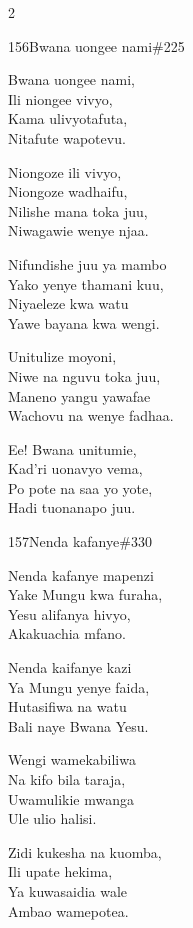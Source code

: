\begin{multicols}{2}
\begin{hymn}{156}{Bwana uongee nami}{\#225}
\begin{stanza}
Bwana uongee nami,\\
Ili niongee vivyo,\\
Kama ulivyotafuta,\\
Nitafute wapotevu.
\end{stanza}
\begin{stanza}
Niongoze ili vivyo,\\
Niongoze wadhaifu,\\
Nilishe mana toka juu,\\
Niwagawie wenye njaa.
\end{stanza}
\begin{stanza}
Nifundishe juu ya mambo\\
Yako yenye thamani kuu,\\
Niyaeleze kwa watu\\
Yawe bayana kwa wengi.
\end{stanza}
\begin{stanza}
Unitulize moyoni,\\
Niwe na nguvu toka juu,\\
Maneno yangu yawafae\\
Wachovu na wenye fadhaa.
\end{stanza}
\begin{stanza}
Ee! Bwana unitumie,\\
Kad'ri uonavyo vema,\\
Po pote na saa yo yote,\\
Hadi tuonanapo juu.
\end{stanza}
\end{hymn}

\begin{hymn}{157}{Nenda kafanye}{\#330}
\begin{stanza}
Nenda kafanye mapenzi\\
Yake Mungu kwa furaha,\\
Yesu alifanya hivyo,\\
Akakuachia mfano.
\end{stanza}
\begin{stanza}
Nenda kaifanye kazi\\
Ya Mungu yenye faida,\\
Hutasifiwa na watu\\
Bali naye Bwana Yesu.
\end{stanza}
\begin{stanza}
Wengi wamekabiliwa\\
Na kifo bila taraja,\\
Uwamulikie mwanga\\
Ule ulio halisi.
\end{stanza}
\begin{stanza}
Zidi kukesha na kuomba,\\
Ili upate hekima,\\
Ya kuwasaidia wale\\
Ambao wamepotea.
\end{stanza}
\end{hymn}


\end{multicols}

